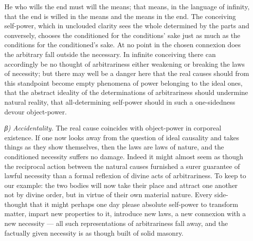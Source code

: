 \documentclass[12pt,a4paper]{book}
\newcommand{\subrunin}[1]{\emph{#1}\hspace{0.4em}}
\begin{document}
He who wills the end must will the means; that means, in the language of infinity, that the end
is willed in the means and the means in the end. The conceiving self-power, which in unclouded
clarity sees the whole determined by the parts and conversely, chooses the conditioned for the
conditions' sake just as much as the conditions for the conditioned's sake. At no point in the
chosen connexion does the arbitrary fall outside the necessary. In infinite conceiving there can
accordingly be no thought of arbitrariness either weakening or breaking the laws of necessity;
but there may well be a danger here that the real causes should from this standpoint become
empty phenomena of power belonging to the ideal ones, that the abstract ideality of the
determinations of arbitrariness should undermine natural reality, that all-determining self-power
should in such a one-sidedness devour object-power.

\subrunin{β) Accidentality.} The real cause coincides with object-power in corporeal existence.
If one now looks away from the question of ideal causality and takes things as they show
themselves, then the laws are laws of nature, and
the conditioned necessity suffers no damage. Indeed it might almost seem as though the reciprocal
action between the natural causes furnished a surer guarantee of lawful necessity than a formal
reflexion of divine acts of arbitrariness. To keep to our example: the two bodies will now take
their place and attract one another not by divine order, but in virtue of their own material
nature. Every side-thought that it might perhaps one day please absolute self-power to transform
matter, impart new properties to it, introduce new laws, a new connexion with a new necessity ---
all such representations of arbitrariness fall away, and the factually given necessity is as
though built of solid masonry.
\end{document}
